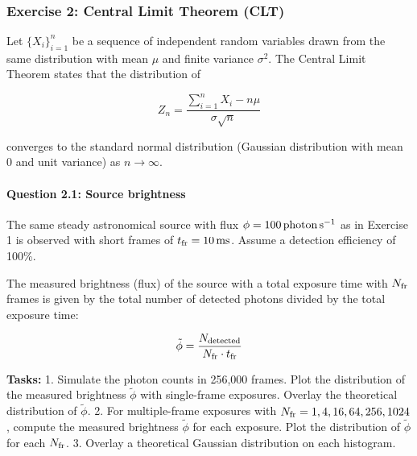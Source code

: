 \documentclass[11pt]{article}
\begin{document}
    \begin{center}
    \end{center}
    { \hspace*{\fill} \\}
    
    \subsubsection{Exercise 2: Central Limit Theorem
(CLT)}\label{exercise-2-central-limit-theorem-clt}

Let \(\{ X_i \}_{i=1}^n\) be a sequence of independent random variables
drawn from the same distribution with mean \(\mu\) and finite variance
\(\sigma^2\). The Central Limit Theorem states that the distribution of

\[Z_n = \frac{\sum_{i=1}^n X_i - n\mu}{\sigma \sqrt{n}}\]

converges to the standard normal distribution (Gaussian distribution
with mean 0 and unit variance) as \(n \to \infty\).

\paragraph{Question 2.1: Source
brightness}\label{question-2.1-source-brightness}

The same steady astronomical source with flux
\(\phi = 100\,{\rm photon}\,{\rm s}^{-1}\) as in Exercise 1 is observed
with short frames of \(t_{\rm fr} = 10\,{\rm ms}\). Assume a detection
efficiency of 100\%.

The measured brightness (flux) of the source with a total exposure time
with \(N_{\rm fr}\) frames is given by the total number of detected
photons divided by the total exposure time:

\[\tilde{\phi} = \frac{N_{\rm detected}}{N_{\rm fr} \cdot t_{\rm fr}}\]

\textbf{Tasks:} 1. Simulate the photon counts in 256,000 frames. Plot
the distribution of the measured brightness \(\tilde{\phi}\) with
single-frame exposures. Overlay the theoretical distribution of
\(\tilde{\phi}\). 2. For multiple-frame exposures with
\(N_{\rm fr} = 1, 4, 16, 64, 256, 1024\), compute the measured
brightness \(\tilde{\phi}\) for each exposure. Plot the distribution of
\(\tilde{\phi}\) for each \(N_{\rm fr}\). 3. Overlay a theoretical
Gaussian distribution on each histogram.
\end{document}
